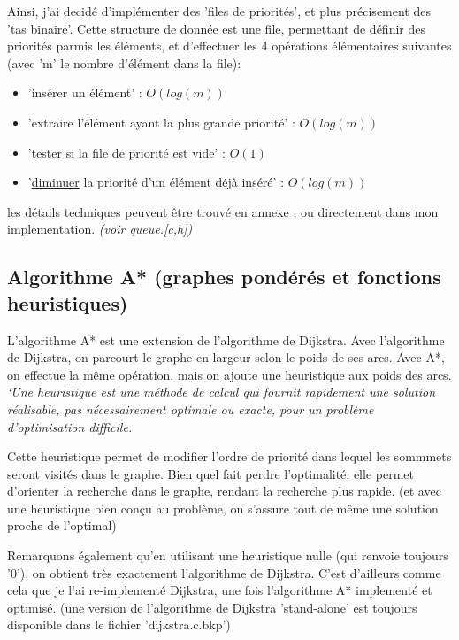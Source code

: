 \documentclass[10pt]{article}
\begin{document}
				Ainsi, j'ai decidé d'implémenter des 'files de priorités', et plus précisement des 'tas binaire'.
				Cette structure de donnée est une file, permettant de définir des priorités parmis les éléments,
				et d'effectuer les 4 opérations élémentaires suivantes (avec 'm' le nombre d'élément dans la file):
				\begin{itemize}[label=-]
					\item 'insérer un élément' : \(O(log(m))\)
					\item 'extraire l'élément ayant la plus grande priorité' : \({O(log(m))}\)
					\item 'tester si la file de priorité est vide' : \(O(1)\)
					\item '\underline{diminuer} la priorité d'un élément déjà inséré' : \(O(log(m))\)
				\end{itemize}
				les détails techniques peuvent être trouvé en annexe \cite{binary_heap},
				ou directement dans mon implementation. \textit{(voir queue.[c,h])}			

		\subsection{Algorithme A* (graphes pondérés et fonctions heuristiques)}
			L'algorithme A* est une extension de l'algorithme de Dijkstra.\newline
			Avec l'algorithme de Dijkstra, on parcourt le graphe en largeur selon le poids de ses arcs.
			Avec A*, on effectue la même opération, mais on ajoute une heuristique aux poids des arcs.
			\textit{`Une heuristique est une méthode de calcul qui fournit rapidement une solution réalisable,
			pas nécessairement optimale ou exacte, pour un problème d'optimisation difficile.} \cite{heuristique}\newline
			
			Cette heuristique permet de modifier l'ordre de priorité dans lequel les sommmets seront visités dans le graphe.
			Bien quel fait perdre l'optimalité, elle permet d'orienter la recherche dans le graphe, rendant la recherche plus rapide.
			(et avec une heuristique bien conçu au problème, on s'assure tout de même une solution proche de l'optimal)\newline
			
			Remarquons également qu'en utilisant une heuristique nulle (qui renvoie toujours '0'),
			on obtient très exactement l'algorithme de Dijkstra. C'est d'ailleurs comme cela que je l'ai re-implementé
			Dijkstra, une fois l'algorithme A* implementé et optimisé.
			(une version de l'algorithme de Dijkstra 'stand-alone' est toujours disponible dans le fichier 'dijkstra.c.bkp')
	
\end{document}
